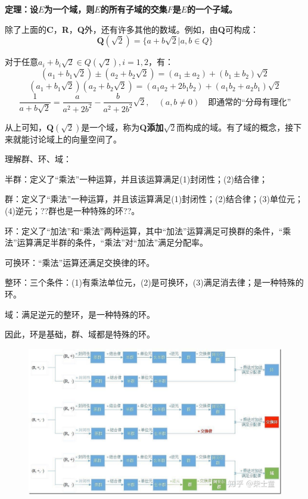 \documentclass[12pt]{article}
\begin{document}
\begin{mdframed}[
linecolor=black!40,outerlinewidth=1pt,roundcorner=.5em,innertopmargin=1ex,innerbottommargin=.5\baselineskip,innerrightmargin=1em,innerleftmargin=1em,backgroundcolor=gray!5,
]
\textbf{
定理：设$E$为一个域，则$E$的所有子域的交集$F$是$E$的一个子域。
}
\end{mdframed}

除了上面的\textbf{C}，\textbf{R}，\textbf{Q}外，还有许多其他的数域。例如，由\textbf{Q}可构成：
$$
\textbf{Q}(\sqrt{2}) = \{a + b\sqrt{2}|a, b \in Q\}
$$

对于任意$a_i + b_i\sqrt{2} \in Q(\sqrt{2}), i = 1, 2$，有：
$$
(a_1 + b_1\sqrt{2}) \pm (a_2 + b_2\sqrt{2}) = (a_1 \pm a_2) + (b_1 \pm b_2)\sqrt{2}
$$
$$ (a_1 + b_1\sqrt{2})(a_2 + b_2\sqrt{2}) = (a_1a_2 + 2b_1b_2) + (a_1b_2 + a_2b_1)\sqrt{2}
$$
$$
\frac{1}{a + b\sqrt{2}} = \frac{a}{a^2+2b^2} - \frac{b}{a^2+2b^2}\sqrt{2}, \quad(a, b \neq 0)\quad\text{即通常的“分母有理化”}
$$

从上可知，$\textbf{Q}(\sqrt{2})$是一个域，称为\textbf{Q}\textbf{添加}$\sqrt{2}$而构成的域。有了域的概念，接下来就能讨论域上的向量空间了。

\begin{framed}
理解群、环、域：

半群：定义了“乘法”一种运算，并且该运算满足(1)封闭性；(2)结合律；

群：定义了“乘法”一种运算，并且该运算满足(1)封闭性；(2)结合律；(3)单位元；(4)逆元；??群也是一种特殊的环??。

环：定义了“加法”和“乘法”两种运算，其中“加法”运算满足可换群的条件，“乘法”运算满足半群的条件，“乘法”对“加法”满足分配率。

可换环：“乘法”运算还满足交换律的环。

整环：三个条件：(1)有乘法单位元，(2)是可换环，(3)满足消去律；是一种特殊的环。

域：满足逆元的整环，是一种特殊的环。

因此，环是基础，群、域都是特殊的环。

\begin{figure}[H]
    \centering
    \includegraphics[width=1.0\textwidth]{fig/GroupRingField.jpg}
\end{figure}
\end{framed}



\end{document}
